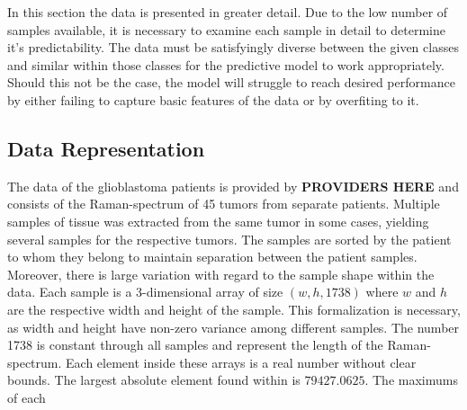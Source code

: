 In this section the data is presented in greater detail. Due to the low number of samples available, it is necessary to examine each sample in detail to determine it's predictability. The data must be satisfyingly diverse between the given classes and similar within those classes for the predictive model to work appropriately. Should this not be the case, the model will struggle to reach desired performance by either failing to capture basic features of the data or by overfiting to it.


\subsection{Data Representation}
The data of the glioblastoma patients is provided by \textbf{PROVIDERS HERE} and consists of the Raman-spectrum of 45 tumors from separate patients. Multiple samples of tissue was extracted from the same tumor in some cases, yielding several samples for the respective tumors. The samples are sorted by the patient to whom they belong to maintain separation between the patient samples. Moreover, there is large variation with regard to the sample shape within the data. Each sample is a 3-dimensional array of size $(w, h, 1738)$ where $w$ and $h$ are the respective width and height of the sample. This formalization is necessary, as width and height have non-zero variance among different samples. The number 1738 is constant through all samples and represent the length of the Raman-spectrum. Each element inside these arrays is a real number without clear bounds. The largest absolute element found within is $79427.0625$. The maximums of each  